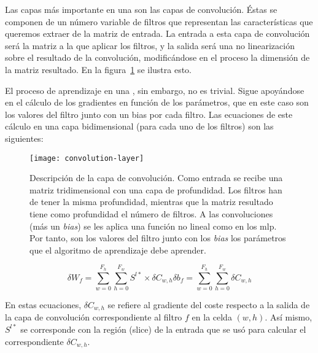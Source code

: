 Las capas más importante en una  son las capas de convolución. Éstas se componen de un número variable de filtros que representan las características que queremos extraer de la matriz de entrada. La entrada a esta capa de convolución será la matriz a la que aplicar los filtros, y la salida será una no linearización sobre el resultado de la convolución, modificándose en el proceso la dimensión de la matriz resultado. En la figura~\ref{fig:cnn-convolution-layer} se ilustra esto.

El proceso de aprendizaje en una , sin embargo, no es trivial. Sigue apoyándose en el cálculo de los gradientes en función de los parámetros, que en este caso son los valores del filtro junto con un bias por cada filtro. Las ecuaciones de este cálculo en una capa bidimensional (para cada uno de los filtros) son las siguientes:

\begin{figure}[t]
	\centering
	\texttt{[image: convolution-layer]}
	\caption[Descripción de la capa de convolución]{Descripción de la capa de convolución. Como entrada se recibe una matriz tridimensional con una capa de profundidad. Los filtros han de tener la misma profundidad, mientras que la matriz resultado tiene como profundidad el número de filtros. A las convoluciones (más un \textit{bias}) se les aplica una función no lineal como en los \ac{mlp}. Por tanto, son los valores del filtro junto con los \textit{bias} los parámetros que el algoritmo de aprendizaje debe aprender.}
	\label{fig:cnn-convolution-layer}
\end{figure}

\begin{subequations}
	\begin{equation}
		\delta W_f = \sum_{w=0}^{F_h} \sum_{h=0}^{F_w} S^{l*} \times \delta C_{w,h} \label{eq:cnn-error-weights}
	\end{equation}
	\begin{equation}
		\delta b_f = \sum_{w=0}^{F_h} \sum_{h=0}^{F_w} \delta C_{w,h} \label{eq:cnn-error-biases}
	\end{equation}
\end{subequations}

En estas ecuaciones, $\delta C_{w,h}$ se refiere al gradiente del coste respecto a la salida de la capa de convolución correspondiente al filtro $f$ en la celda $(w, h)$. Así mismo, $S^{l*}$ se corresponde con la región (slice) de la entrada que se usó para calcular el correspondiente $\delta C_{w,h}$.

